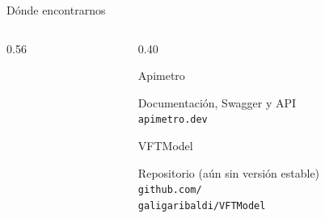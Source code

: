 \begin{frame}{Dónde encontrarnos}
  \begin{columns}[c]
    \begin{column}{0.56\textwidth}
      \centering
      \resizebox{\linewidth}{!}{}\par
    \end{column}
    \begin{column}{0.40\textwidth}
      \small
      {\setlength{\fboxsep}{4pt}%
      \begin{block}{\footnotesize Apimetro}
        \begin{minipage}[c]{2.2cm}
          \colorbox{white}{}
        \end{minipage}\hfill
        \begin{minipage}[c]{\dimexpr\linewidth-2.5cm}
          \raggedright\scriptsize Documentación, Swagger y API\\[2pt]
          \texttt{apimetro.dev}
        \end{minipage}
      \end{block}
      \begin{block}{\footnotesize VFTModel}
        \begin{minipage}[c]{2.2cm}
          \colorbox{white}{}
        \end{minipage}\hfill
        \begin{minipage}[c]{\dimexpr\linewidth-2.5cm}
          \raggedright\scriptsize Repositorio (aún sin versión estable)\\[2pt]
          \texttt{github.com/}\\\texttt{galigaribaldi/VFTModel}
        \end{minipage}
      \end{block}}
    \end{column}
  \end{columns}
\end{frame}
